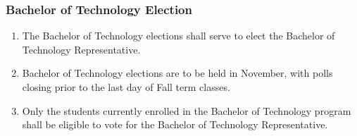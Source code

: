 \hypertarget{bachelor-of-technology-election}{%
 \subsubsection{Bachelor of Technology
  Election}
 \label{bachelor-of-technology-election}}
\begin{enumerate}
 \item
  The Bachelor of Technology elections shall serve to elect the Bachelor
  of Technology Representative.
 \item
  Bachelor of Technology elections are to be held in November, with
  polls closing prior to the last day of Fall term classes.
 \item
  Only the students currently enrolled in the Bachelor of Technology
  program shall be eligible to vote for the Bachelor of Technology
  Representative.
\end{enumerate}

